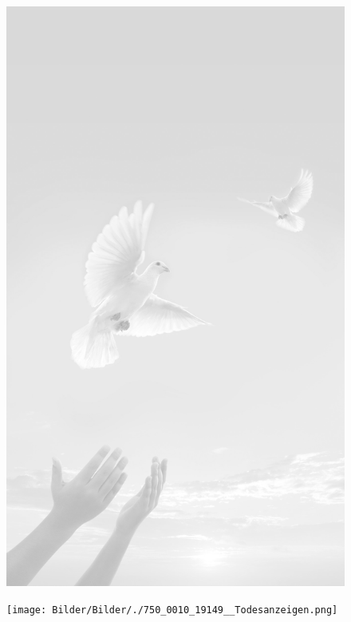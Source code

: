 \documentclass[ngerman,a4paper,11pt]{scrreprt}
\begin{document}
\begin{figure}[H]
\centering
\includegraphics[width=\textwidth,height=.8\textheight]{Bilder/Bilder/./750_0010_18779_Todesanzeigen.jpg}
\end{figure}

\begin{figure}[H]
\centering
\texttt{[image: Bilder/Bilder/./750\_0010\_19149\_\_Todesanzeigen.png]}
\end{figure}
\end{document}

